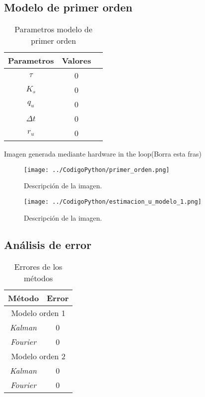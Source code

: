 \documentclass[conference]{IEEEtran}
\begin{document}
\subsection{Modelo de primer orden}

\begin{table}[h]
	\centering
	\caption{Parametros modelo de primer orden}
	\label{tab:parametros_primer_orden}
	\begin{tabular}{|c|c|c|}
		\hline
		\textbf{Parametros} & \textbf{Valores} \\
		\hline
		$\tau$  &  0 \\
		$K_s$      & 0 \\
		$q_u$ & 0 \\
		$\Delta t$ & 0\\  
		$r_u$ & 0 \\ 
		\hline
	\end{tabular}
	
\end{table}

Imagen generada mediante hardware in the loop(Borra esta fras)


\begin{figure}[h]
	\centering
	\texttt{[image: ../CodigoPython/primer\_orden.png]}
	\caption{Descripción de la imagen.}
	\label{fig:primer_orden}
\end{figure}

\begin{figure}[h]
	\centering
	\texttt{[image: ../CodigoPython/estimacion\_u\_modelo\_1.png]}
	\caption{Descripción de la imagen.}
	\label{fig:u_modelo_1}
\end{figure}

\subsection{An\'alisis de error} 

\begin{table}[h]
	\centering
	\caption{Errores de los m\'etodos}
	\label{tab:errores}
	\begin{tabular}{|c|c|}
		\hline
		
		\textbf{M\'etodo} & \textbf{Error} \\
		\hline
		\multicolumn{2}{|c|}{Modelo orden 1} \\
		\hline
		\textit{Kalman}  &  0 \\
		\textit{Fourier} & 0 \\
		\hline
		\multicolumn{2}{|c|}{Modelo orden 2} \\
		\hline
		\textit{Kalman}  &  0 \\
		\textit{Fourier} & 0 \\
		\hline
	\end{tabular}
	
\end{table}
\end{document}
